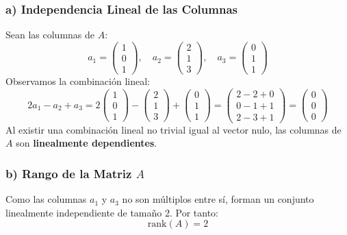 \documentclass[11pt,a4paper]{article}
\theoremstyle{definition}
\theoremstyle{remark}
\begin{document}
\subsubsection{a) Independencia Lineal de las Columnas}
Sean las columnas de $A$:
\begin{equation}
    a_1 = \begin{pmatrix} 1 \\ 0 \\ 1 \end{pmatrix}, \quad
    a_2 = \begin{pmatrix} 2 \\ 1 \\ 3 \end{pmatrix}, \quad
    a_3 = \begin{pmatrix} 0 \\ 1 \\ 1 \end{pmatrix}
\end{equation}
Observamos la combinación lineal:
\begin{equation}
    2 a_1 - a_2 + a_3 = 2 \begin{pmatrix} 1 \\ 0 \\ 1 \end{pmatrix} - \begin{pmatrix} 2 \\ 1 \\ 3 \end{pmatrix} + \begin{pmatrix} 0 \\ 1 \\ 1 \end{pmatrix} = \begin{pmatrix} 2 - 2 + 0 \\ 0 - 1 + 1 \\ 2 - 3 + 1 \end{pmatrix} = \begin{pmatrix} 0 \\ 0 \\ 0 \end{pmatrix}
\end{equation}
Al existir una combinación lineal no trivial igual al vector nulo, las columnas de $A$ son \textbf{linealmente dependientes}.

\subsubsection{b) Rango de la Matriz $A$}
Como las columnas $a_1$ y $a_3$ no son múltiplos entre sí, forman un conjunto linealmente independiente de tamaño 2. Por tanto:
\begin{equation}
    \text{rank}(A) = 2
\end{equation}
\end{document}
